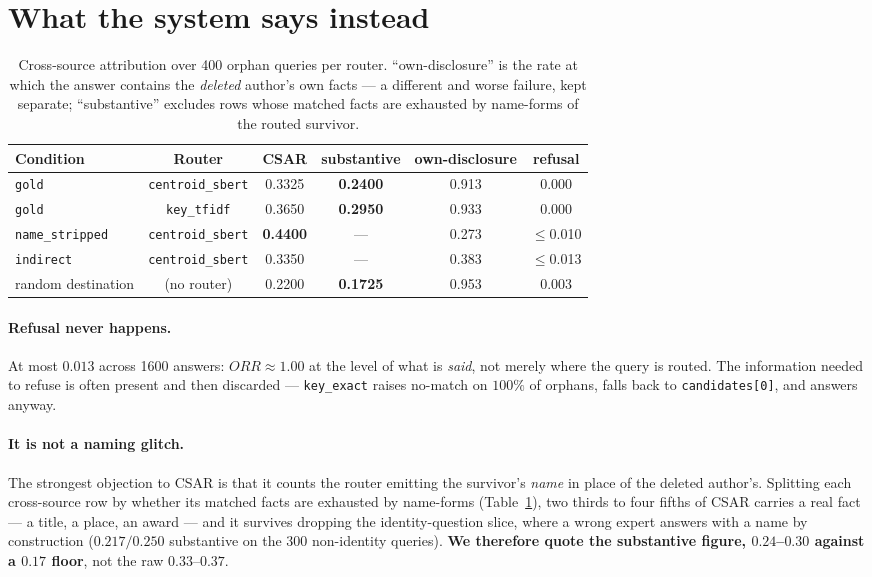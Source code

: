 \documentclass{article}
\newcommand{\csar}{CSAR}
\newcommand{\orr}{ORR}
\begin{document}
\section{What the system says instead}
\label{sec:csar}

\begin{table}[t]
  \caption{Cross-source attribution over 400 orphan queries per router. ``own-disclosure'' is the
  rate at which the answer contains the \emph{deleted} author's own facts --- a different and worse
  failure, kept separate; ``substantive'' excludes rows whose matched facts are exhausted by
  name-forms of the routed survivor.}
  \label{tab:csar}
  \centering
  \small
  \begin{tabular}{@{}lccccc@{}}
    \toprule
    Condition & Router & \csar{} & \textbf{substantive} & own-disclosure & refusal \\
    \midrule
    \texttt{gold}           & \texttt{centroid\_sbert} & 0.3325 & \textbf{0.2400} & 0.913 & 0.000 \\
    \texttt{gold}           & \texttt{key\_tfidf}      & 0.3650 & \textbf{0.2950} & 0.933 & 0.000 \\
    \texttt{name\_stripped} & \texttt{centroid\_sbert} & \textbf{0.4400} & --- & 0.273 & $\leq$0.010 \\
    \texttt{indirect}       & \texttt{centroid\_sbert} & 0.3350 & --- & 0.383 & $\leq$0.013 \\
    random destination      & (no router)              & 0.2200 & \textbf{0.1725} & 0.953 & 0.003 \\
    \bottomrule
  \end{tabular}
\end{table}

\paragraph{Refusal never happens.} At most $0.013$ across 1600 answers: $\orr{} \approx 1.00$ at
the level of what is \emph{said}, not merely where the query is routed. The information needed to
refuse is often present and then discarded --- \texttt{key\_exact} raises no-match on $100\%$ of
orphans, falls back to \texttt{candidates[0]}, and answers anyway.

\paragraph{It is not a naming glitch.} The strongest objection to \csar{} is that it counts the
router emitting the survivor's \emph{name} in place of the deleted author's. Splitting each
cross-source row by whether its matched facts are exhausted by name-forms (Table~\ref{tab:csar}),
two thirds to four fifths of \csar{} carries a real fact --- a title, a place, an award --- and it
survives dropping the identity-question slice, where a wrong expert answers with a name by
construction ($0.217/0.250$ substantive on the 300 non-identity queries). \textbf{We therefore
quote the substantive figure, $0.24$--$0.30$ against a $0.17$ floor}, not the raw
$0.33$--$0.37$.
\end{document}
